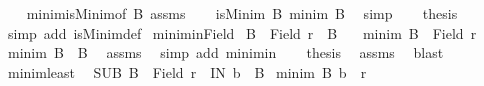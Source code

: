 \begin{isabellebody}
%
\isadelimproof
%
\endisadelimproof
%
\isatagproof
{}\isamarkupfalse%
{\isacharminus}{\kern0pt}\isanewline
\ \ \isamarkupfalse%
\ minim{\isacharunderscore}{\kern0pt}isMinim{\isacharbrackleft}{\kern0pt}of\ B{\isacharbrackright}{\kern0pt}\ assms\isanewline
\ \ \isamarkupfalse%
\ {\isachardoublequoteopen}isMinim\ B\ {\isacharparenleft}{\kern0pt}minim\ B{\isacharparenright}{\kern0pt}{\isachardoublequoteclose}\ \isamarkupfalse%
\ simp\isanewline
\ \ \isamarkupfalse%
\ {\isacharquery}{\kern0pt}thesis\ \isamarkupfalse%
\ {\isacharparenleft}{\kern0pt}simp\ add{\isacharcolon}{\kern0pt}\ isMinim{\isacharunderscore}{\kern0pt}def{\isacharparenright}{\kern0pt}\isanewline
{}\isamarkupfalse%
%
\endisatagproof
{\isafoldproof}%
%
\isadelimproof
\isanewline
%
\endisadelimproof
\isanewline
{}\isamarkupfalse%
\ minim{\isacharunderscore}{\kern0pt}inField{\isacharcolon}{\kern0pt}\isanewline
{}\ {\isachardoublequoteopen}B\ {\isasymle}\ Field\ r{\isachardoublequoteclose}\ \ {\isachardoublequoteopen}B\ {\isasymnoteq}\ {\isacharbraceleft}{\kern0pt}{\isacharbraceright}{\kern0pt}{\isachardoublequoteclose}\isanewline
{}\ {\isachardoublequoteopen}minim\ B\ {\isasymin}\ Field\ r{\isachardoublequoteclose}\isanewline
%
\isadelimproof
%
\endisadelimproof
%
\isatagproof
{}\isamarkupfalse%
{\isacharminus}{\kern0pt}\isanewline
\ \ \isamarkupfalse%
\ {\isachardoublequoteopen}minim\ B\ {\isasymin}\ B{\isachardoublequoteclose}\ \isamarkupfalse%
\ assms\ \isamarkupfalse%
\ {\isacharparenleft}{\kern0pt}simp\ add{\isacharcolon}{\kern0pt}\ minim{\isacharunderscore}{\kern0pt}in{\isacharparenright}{\kern0pt}\isanewline
\ \ \isamarkupfalse%
\ {\isacharquery}{\kern0pt}thesis\ \isamarkupfalse%
\ assms\ \isamarkupfalse%
\ blast\isanewline
{}\isamarkupfalse%
%
\endisatagproof
{\isafoldproof}%
%
\isadelimproof
\isanewline
%
\endisadelimproof
\isanewline
{}\isamarkupfalse%
\ minim{\isacharunderscore}{\kern0pt}least{\isacharcolon}{\kern0pt}\isanewline
{}\ \ SUB{\isacharcolon}{\kern0pt}\ {\isachardoublequoteopen}B\ {\isasymle}\ Field\ r{\isachardoublequoteclose}\ \ IN{\isacharcolon}{\kern0pt}\ {\isachardoublequoteopen}b\ {\isasymin}\ B{\isachardoublequoteclose}\isanewline
{}\ {\isachardoublequoteopen}{\isacharparenleft}{\kern0pt}minim\ B{\isacharcomma}{\kern0pt}\ b{\isacharparenright}{\kern0pt}\ {\isasymin}\ r{\isachardoublequoteclose}\isanewline

\end{isabellebody}
